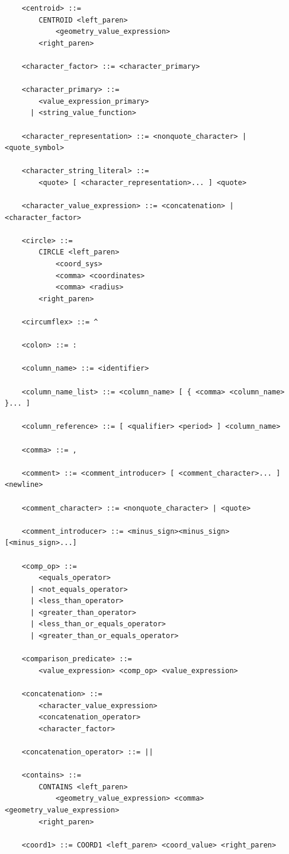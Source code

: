 \documentclass[11pt,a4paper]{ivoa}
\begin{document}
\begin{verbatim}
    <centroid> ::=
        CENTROID <left_paren>
            <geometry_value_expression>
        <right_paren>

    <character_factor> ::= <character_primary>

    <character_primary> ::=
        <value_expression_primary>
      | <string_value_function>

    <character_representation> ::= <nonquote_character> | <quote_symbol>

    <character_string_literal> ::=
        <quote> [ <character_representation>... ] <quote>

    <character_value_expression> ::= <concatenation> | <character_factor>

    <circle> ::=
        CIRCLE <left_paren>
            <coord_sys>
            <comma> <coordinates>
            <comma> <radius>
        <right_paren>

    <circumflex> ::= ^

    <colon> ::= :

    <column_name> ::= <identifier>

    <column_name_list> ::= <column_name> [ { <comma> <column_name> }... ]

    <column_reference> ::= [ <qualifier> <period> ] <column_name>

    <comma> ::= ,

    <comment> ::= <comment_introducer> [ <comment_character>... ] <newline>

    <comment_character> ::= <nonquote_character> | <quote>

    <comment_introducer> ::= <minus_sign><minus_sign> [<minus_sign>...]

    <comp_op> ::=
        <equals_operator>
      | <not_equals_operator>
      | <less_than_operator>
      | <greater_than_operator>
      | <less_than_or_equals_operator>
      | <greater_than_or_equals_operator>

    <comparison_predicate> ::=
        <value_expression> <comp_op> <value_expression>

    <concatenation> ::=
        <character_value_expression>
        <concatenation_operator>
        <character_factor>

    <concatenation_operator> ::= ||

    <contains> ::=
        CONTAINS <left_paren>
            <geometry_value_expression> <comma> <geometry_value_expression>
        <right_paren>

    <coord1> ::= COORD1 <left_paren> <coord_value> <right_paren>


\end{verbatim}
\end{document}
